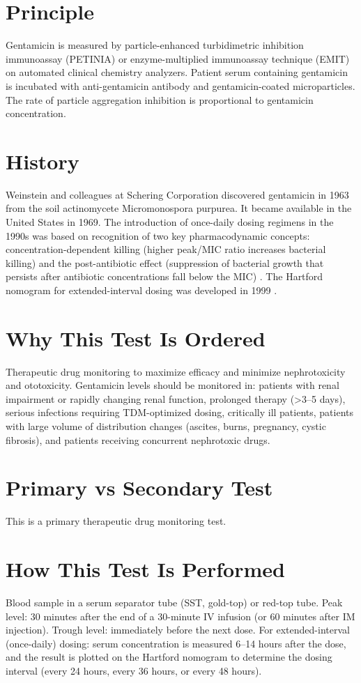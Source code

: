 \section*{Principle}
Gentamicin is measured by particle-enhanced turbidimetric inhibition immunoassay (PETINIA) or enzyme-multiplied immunoassay technique (EMIT) on automated clinical chemistry analyzers. Patient serum containing gentamicin is incubated with anti-gentamicin antibody and gentamicin-coated microparticles. The rate of particle aggregation inhibition is proportional to gentamicin concentration.

\section*{History}
Weinstein and colleagues at Schering Corporation discovered gentamicin in 1963 from the soil actinomycete Micromonospora purpurea. It became available in the United States in 1969. The introduction of once-daily dosing regimens in the 1990s was based on recognition of two key pharmacodynamic concepts: concentration-dependent killing (higher peak/MIC ratio increases bacterial killing) and the post-antibiotic effect (suppression of bacterial growth that persists after antibiotic concentrations fall below the MIC) \cite{freeman1997once}. The Hartford nomogram for extended-interval dosing was developed in 1999 \cite{nicolau1995experience}.

\section*{Why This Test Is Ordered}
Therapeutic drug monitoring to maximize efficacy and minimize nephrotoxicity and ototoxicity. Gentamicin levels should be monitored in: patients with renal impairment or rapidly changing renal function, prolonged therapy (>3--5 days), serious infections requiring TDM-optimized dosing, critically ill patients, patients with large volume of distribution changes (ascites, burns, pregnancy, cystic fibrosis), and patients receiving concurrent nephrotoxic drugs.

\section*{Primary vs Secondary Test}
This is a primary therapeutic drug monitoring test.

\section*{How This Test Is Performed}
Blood sample in a serum separator tube (SST, gold-top) or red-top tube. Peak level: 30 minutes after the end of a 30-minute IV infusion (or 60 minutes after IM injection). Trough level: immediately before the next dose. For extended-interval (once-daily) dosing: serum concentration is measured 6--14 hours after the dose, and the result is plotted on the Hartford nomogram to determine the dosing interval (every 24 hours, every 36 hours, or every 48 hours).

